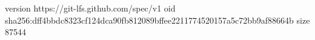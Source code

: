 version https://git-lfs.github.com/spec/v1
oid sha256:dff4bbdc8323cf124dca90fb812089bffee2211774520157a5c72bb9af88664b
size 87544
